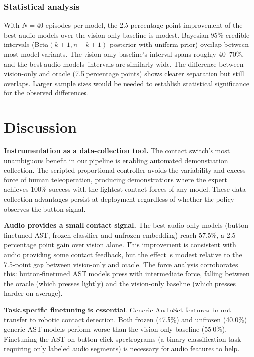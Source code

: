 \documentclass[conference]{IEEEtran}
\begin{document}
\subsubsection{Statistical analysis}

With $N{=}40$ episodes per model, the 2.5 percentage point improvement of the best audio models over the vision-only baseline is modest.
Bayesian 95\% credible intervals (Beta$(k{+}1, n{-}k{+}1)$ posterior with uniform prior) overlap between most model variants.
The vision-only baseline's interval spans roughly 40--70\%, and the best audio models' intervals are similarly wide.
The difference between vision-only and oracle (7.5 percentage points) shows clearer separation but still overlaps.
Larger sample sizes would be needed to establish statistical significance for the observed differences.

\section{Discussion}

\textbf{Instrumentation as a data-collection tool.}
The contact switch's most unambiguous benefit in our pipeline is enabling automated demonstration collection.
The scripted proportional controller avoids the variability and excess force of human teleoperation, producing demonstrations where the expert achieves 100\% success with the lightest contact forces of any model.
These data-collection advantages persist at deployment regardless of whether the policy observes the button signal.

\textbf{Audio provides a small contact signal.}
The best audio-only models (button-finetuned AST, frozen classifier and unfrozen embedding) reach 57.5\%, a 2.5 percentage point gain over vision alone.
This improvement is consistent with audio providing some contact feedback, but the effect is modest relative to the 7.5-point gap between vision-only and oracle.
The force analysis corroborates this: button-finetuned AST models press with intermediate force, falling between the oracle (which presses lightly) and the vision-only baseline (which presses harder on average).

\textbf{Task-specific finetuning is essential.}
Generic AudioSet features do not transfer to robotic contact detection.
Both frozen (47.5\%) and unfrozen (40.0\%) generic AST models perform worse than the vision-only baseline (55.0\%).
Finetuning the AST on button-click spectrograms (a binary classification task requiring only labeled audio segments) is necessary for audio features to help.
\end{document}
